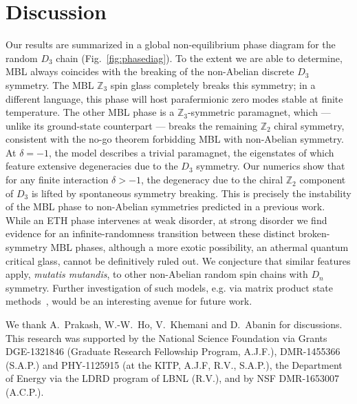 \documentclass[prb,aps, twocolumn, superscriptaddress]{revtex4-1}
\begin{document}
\section{Discussion} Our results are summarized in a global non-equilibrium phase diagram for the random $D_3$ chain (Fig.~\ref{fig:phasediag}). To the extent we are able to determine, MBL always coincides with the breaking of the non-Abelian discrete $D_3$ symmetry. The MBL ${\mathbb{Z}_3}$ spin glass completely breaks this symmetry; in a different language, this phase will host parafermionic zero modes stable at finite temperature. The other MBL phase is a ${\mathbb{Z}_3}$-symmetric paramagnet, which --- unlike its ground-state counterpart --- breaks the remaining ${\mathbb{Z}_2}$ chiral symmetry,  consistent with the no-go theorem forbidding MBL with non-Abelian symmetry. 
At $\delta = -1$, the model describes a trivial paramagnet, the eigenstates of which feature extensive degeneracies due to the $D_3$ symmetry. Our numerics show that for any finite interaction $\delta > -1$, the degeneracy due to the chiral $\mathbb{Z}_2$ component of $D_3$ is lifted by spontaneous symmetry breaking. This is precisely the instability of the MBL phase to non-Abelian symmetries predicted in a previous work\cite{PhysRevB.94.224206}. While an ETH phase intervenes at weak disorder, at strong disorder we find evidence for an infinite-randomness transition between these distinct broken-symmetry MBL phases, although a  more exotic possibility, an athermal quantum critical glass, cannot be definitively ruled out. We conjecture that similar features apply, {\it mutatis mutandis}, to other non-Abelian random spin chains with $D_n$ symmetry. Further investigation of such models, e.g. via matrix product state methods~\cite{PhysRevB.94.041116,PhysRevLett.116.247204, PhysRevLett.118.017201,PhysRevB.95.035116}, would be an interesting avenue for future work. 



\begin{acknowledgements} We thank  A.~Prakash, {W.-W.~Ho}, V.~Khemani and  D.~Abanin for discussions. This research was supported by the National Science Foundation via Grants DGE-1321846 (Graduate Research Fellowship Program, A.J.F.),  DMR-1455366 (S.A.P.) and PHY-1125915 (at the KITP, A.J.F, R.V., S.A.P.), the Department of Energy via the LDRD program of LBNL (R.V.), and by NSF DMR-1653007 (A.C.P.). 
\end{acknowledgements}
\end{document}
